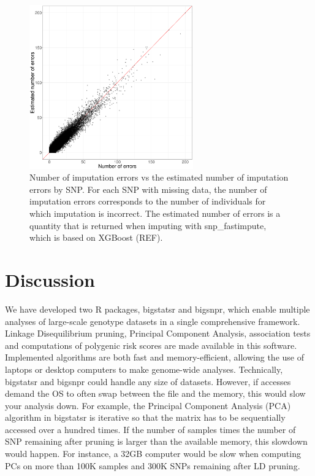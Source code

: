 \documentclass{bioinfo}
\begin{document}
\begin{figure}[!tpb]
\centerline{\includegraphics[width=200pt]{error-impute}}
\caption{Number of imputation errors vs the estimated number of imputation errors by SNP. For each SNP with missing data, the number of imputation errors corresponds to the number of individuals for which imputation is incorrect. The estimated number of errors is a quantity that is returned when imputing with snp\_fastimpute, which is based on XGBoost (REF).}\label{fig:error-impute}
\end{figure}

\section{Discussion}

We have developed two R packages, bigstatsr and bigsnpr, which enable multiple analyses of large-scale genotype datasets in a single comprehensive framework. Linkage Disequilibrium pruning, Principal Component Analysis, association tests and computations of polygenic risk scores are made available in this software. Implemented algorithms are both fast and memory-efficient, allowing the use of laptops or desktop computers to make genome-wide analyses. Technically, bigstatsr and bigsnpr could handle any size of datasets. However, if accesses demand the OS to often swap between the file and the memory, this would slow your analysis down. For example, the Principal Component Analysis (PCA) algorithm in bigstatsr is iterative so that the matrix has to be sequentially accessed over a hundred times. If the number of samples times the number of SNP remaining after pruning is larger than the available memory, this slowdown would happen. For instance, a 32GB computer would be slow when computing PCs on more than 100K samples and 300K SNPs remaining after LD pruning.
\end{document}
